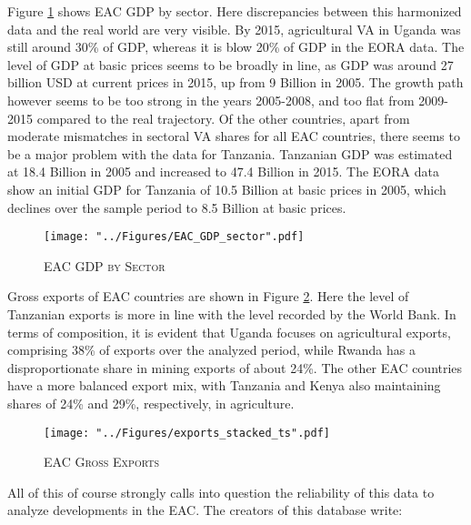 \documentclass[a4paper]{article}
\begin{document}
Figure \ref{fig:EAC_GDP_sec} shows EAC GDP by sector. Here discrepancies between this harmonized data and the real world are very visible. By 2015, agricultural VA in Uganda was still around 30\% of GDP, whereas it is blow 20\% of GDP in the EORA data. The level of GDP at basic prices seems to be broadly in line, as GDP was around 27 billion USD at current prices in 2015, up from 9 Billion in 2005. The growth path however seems to be too strong in the years 2005-2008, and too flat from 2009-2015 compared to the real trajectory. Of the other countries, apart from moderate mismatches in sectoral VA shares for all EAC countries, there seems to be a major problem with the data for Tanzania. Tanzanian GDP was estimated at 18.4 Billion in 2005 and increased to 47.4 Billion in 2015. The EORA data show an initial GDP for Tanzania of 10.5 Billion at basic prices in 2005, which declines over the sample period to 8.5 Billion at basic prices. \newline



\begin{figure}[h!]
\centering
\caption{\label{fig:EAC_GDP_sec}\textsc{EAC GDP by Sector}}
\texttt{[image: "../Figures/EAC\_GDP\_sector".pdf]} %
\end{figure}
\FloatBarrier

Gross exports of EAC countries are shown in Figure \ref{fig:exp}. Here the level of Tanzanian exports is more in line with the level recorded by the World Bank. In terms of composition, it is evident that Uganda focuses on agricultural exports, comprising 38\% of exports over the analyzed period, while Rwanda has a disproportionate share in mining exports of about 24\%. The other EAC countries have a more balanced export mix, with Tanzania and Kenya also maintaining shares of 24\% and 29\%, respectively, in agriculture. 


\begin{figure}[h!]
\centering
\caption{\label{fig:exp}\textsc{EAC Gross Exports}}
\texttt{[image: "../Figures/exports\_stacked\_ts".pdf]} %
\end{figure}
\FloatBarrier

All of this of course strongly calls into question the reliability of this data to analyze developments in the EAC. The creators of this database write:
\end{document}
